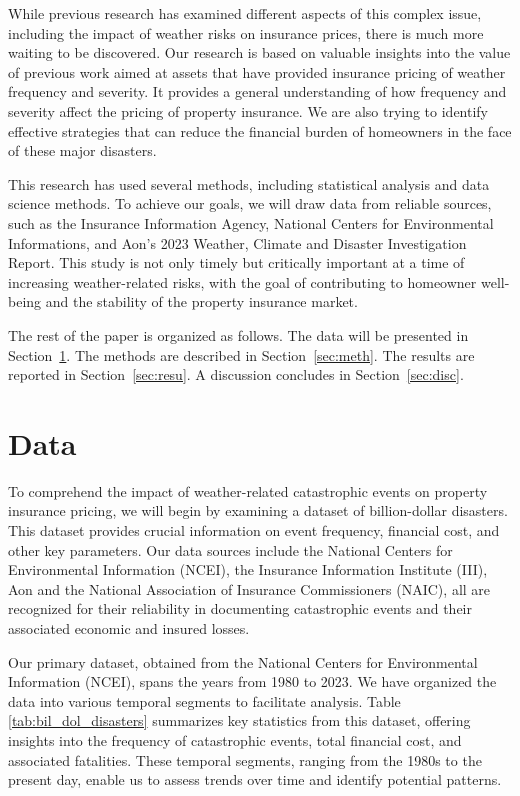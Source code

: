 \documentclass[12pt]{article}
\begin{document}
While previous research has examined different aspects of this complex issue, including the impact of weather risks on insurance 
prices, there is much more waiting to be discovered. Our research is based on valuable insights into the value of previous work 
\cite{hurricaneco} aimed at assets that have provided insurance pricing of weather frequency and severity. It provides a general 
understanding of how frequency and severity affect the pricing of property insurance. We are also trying to identify effective 
strategies that can reduce the financial burden of homeowners in the face of these major disasters.


This research has used several methods, including statistical analysis and data science methods. To achieve our goals, we will draw 
data from reliable sources, such as the Insurance Information Agency, National Centers for Environmental Informations, and Aon's 2023 
Weather, Climate and Disaster Investigation Report. This study is not only timely but critically important at a time of increasing 
weather-related risks, with the goal of contributing to homeowner well-being and the stability of the property insurance market.

The rest of the paper is organized as follows.
The data will be presented in Section~\ref{sec:data}.
The methods are described in Section~\ref{sec:meth}.
The results are reported in Section~\ref{sec:resu}.
A discussion concludes in Section~\ref{sec:disc}.


\section{Data}
\label{sec:data}
To comprehend the impact of weather-related catastrophic events on property insurance pricing, we will begin by examining a dataset of 
billion-dollar disasters. This dataset provides crucial information on event frequency, financial cost, and other key parameters. Our 
data sources include the National Centers for Environmental Information (NCEI)\cite{ncei}, the Insurance Information Institute 
(III)\cite{iii}, Aon\cite{aon} and the National Association of Insurance Commissioners (NAIC)\cite{naic}, all are recognized for their 
reliability in documenting catastrophic events and their associated economic and insured losses.

Our primary dataset, obtained from the National Centers for Environmental Information (NCEI)\cite{ncei}, spans the years from 1980 to 
2023. We have organized the data into various temporal segments to facilitate analysis. Table \ref{tab:bil_dol_disasters} 
summarizes key statistics from this dataset, offering insights into the frequency of catastrophic events, total financial cost, and 
associated fatalities. These temporal segments, ranging from the 1980s to the present day, enable us to assess trends over time and 
identify potential patterns.
\end{document}
